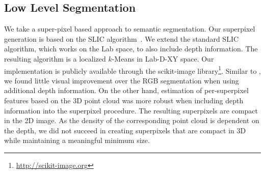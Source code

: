 \documentclass[a4paper, 10pt, conference]{ieeeconf}      %
\begin{document}
\subsection{Low Level Segmentation}
We take a super-pixel based approach to semantic segmentation.
Our superpixel generation is based on the SLIC algorithm~\citep{achanta2012slic}. We extend the
standard SLIC algorithm, which works on the Lab space, to also include 
depth information. The resulting algorithm is a localized $k$-Means in Lab-D-XY space.
Our implementation is publicly available through the scikit-image library\footnote{\url{http://scikit-image.org}}.
Similar to \citet{SilbermanECCV12}, we found little visual improvement over the
RGB segmentation when using additional depth information. On the other hand,
estimation of per-superpixel features based on the 3D point cloud was more
robust when including depth information into the superpixel procedure.
The resulting superpixels are compact in the 2D image. As the density of the
corresponding point cloud is dependent on the depth, we did not succeed in
creating superpixels that are compact in 3D while maintaining a meaningful
minimum size.
\end{document}
